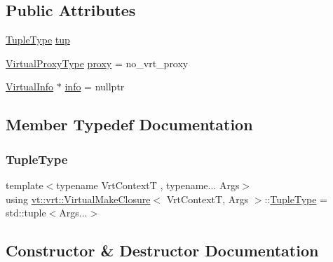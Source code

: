 \subsection*{Public Attributes}
\begin{DoxyCompactItemize}
\item 
\hyperlink{structvt_1_1vrt_1_1_virtual_make_closure_a19b5a051873fa150d9e8ef778fa8afb2}{Tuple\+Type} \hyperlink{structvt_1_1vrt_1_1_virtual_make_closure_abdf06c446440f2a8db8a878cd9b49787}{tup}
\item 
\hyperlink{namespacevt_a1b417dd5d684f045bb58a0ede70045ac}{Virtual\+Proxy\+Type} \hyperlink{structvt_1_1vrt_1_1_virtual_make_closure_a24155fa51b8eaea96911853979509c23}{proxy} = no\+\_\+vrt\+\_\+proxy
\item 
\hyperlink{structvt_1_1vrt_1_1_virtual_info}{Virtual\+Info} $\ast$ \hyperlink{structvt_1_1vrt_1_1_virtual_make_closure_ac7c9f7fb914be06a6c97912630d3c97a}{info} = nullptr
\end{DoxyCompactItemize}


\subsection{Member Typedef Documentation}
\mbox{\label{structvt_1_1vrt_1_1_virtual_make_closure_a19b5a051873fa150d9e8ef778fa8afb2}} 
\subsubsection{\texorpdfstring{Tuple\+Type}{TupleType}}
{\footnotesize\ttfamily template$<$typename Vrt\+ContextT , typename... Args$>$ \\
using \hyperlink{structvt_1_1vrt_1_1_virtual_make_closure}{vt\+::vrt\+::\+Virtual\+Make\+Closure}$<$ Vrt\+ContextT, Args $>$\+::\hyperlink{structvt_1_1vrt_1_1_virtual_make_closure_a19b5a051873fa150d9e8ef778fa8afb2}{Tuple\+Type} =  std\+::tuple$<$Args...$>$}



\subsection{Constructor \& Destructor Documentation}
\mbox{\label{structvt_1_1vrt_1_1_virtual_make_closure_a938686b8988330e10f83640b8175df3a}} 
